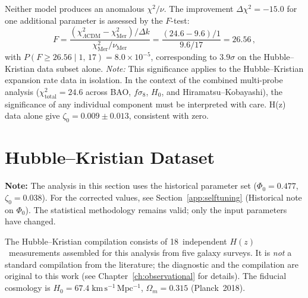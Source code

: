 \noindent
Neither model produces an anomalous $\chi^2/\nu$. The improvement $\Delta\chi^2 = -15.0$ for one additional parameter is assessed by the $F$-test:
\begin{equation}
  F = \frac{(\chi^2_{\Lambda\mathrm{CDM}} - \chi^2_{\mathrm{Mer}}) / \Delta k}{\chi^2_{\mathrm{Mer}} / \nu_{\mathrm{Mer}}}
    = \frac{(24.6 - 9.6)/1}{9.6/17}
    = 26.56\,,
\end{equation}
with $P(F \geq 26.56 \mid 1,\, 17) = 8.0 \times 10^{-5}$, corresponding to $3.9\sigma$ on the Hubble--Kristian data subset alone. \textit{Note:} This significance applies to the Hubble--Kristian expansion rate data in isolation. In the context of the combined multi-probe analysis ($\chi^2_{\mathrm{total}} = 24.6$ across BAO, $f\sigma_8$, $H_0$, and Hiramatsu--Kobayashi), the significance of any individual component must be interpreted with care. H(z) data alone give $\zeta_0 = 0.009 \pm 0.013$, consistent with zero.


\section{Hubble--Kristian Dataset}
\label{app:hk}

\textbf{Note:} The analysis in this section uses the historical parameter set ($\Phi_0 = 0.477$, $\zeta_0 = 0.038$). For the corrected values, see Section~\ref{app:selftuning} (Historical note on $\Phi_0$). The statistical methodology remains valid; only the input parameters have changed.

\medskip

The Hubble--Kristian compilation consists of 18~independent $H(z)$~measurements assembled for this analysis from five galaxy surveys. It is \emph{not} a standard compilation from the literature; the diagnostic and the compilation are original to this work (see Chapter~\ref{ch:observational} for details). The fiducial cosmology is $H_0 = 67.4\;\mathrm{km\,s^{-1}\,Mpc^{-1}}$, $\Omega_m = 0.315$ (Planck~2018).

